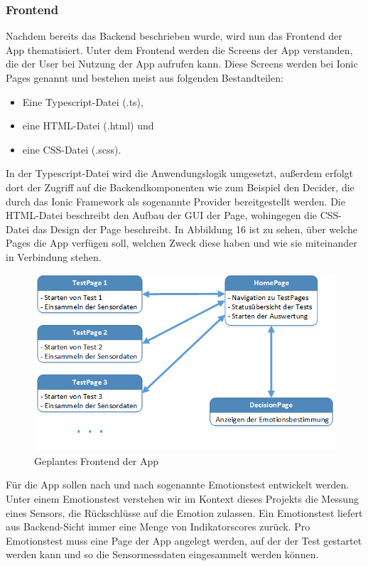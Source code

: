 \subsubsection{Frontend}
Nachdem bereits das Backend beschrieben wurde, wird nun das Frontend der App thematisiert. Unter dem Frontend werden die Screens der App verstanden, die der User bei Nutzung der App aufrufen kann. Diese Screens werden bei Ionic Pages genannt und bestehen meist aus folgenden Bestandteilen: 
\begin{itemize}[noitemsep, topsep=0pt]
	\item Eine Typescript-Datei (.ts), 
	\item eine HTML-Datei (.html) und
	\item eine CSS-Datei (.scss).
\end{itemize}
In der Typescript-Datei wird die Anwendungslogik umgesetzt, außerdem erfolgt dort der Zugriff auf die Backendkomponenten wie zum Beispiel den Decider, die durch das Ionic Framework als sogenannte Provider bereitgestellt werden. Die HTML-Datei beschreibt den Aufbau der GUI der Page, wohingegen die CSS-Datei das Design der Page beschreibt. \newline
In Abbildung 16 ist zu sehen, über welche Pages die App verfügen soll, welchen Zweck diese haben und wie sie miteinander in Verbindung stehen.
\begin{figure}[h]
	\centering
	\includegraphics[width=15cm]{Bilder/frontend.png}
	\caption[Geplantes Frontend der App]{Geplantes Frontend der App}
\end{figure}%
\newline
Für die App sollen nach und nach sogenannte Emotionstest entwickelt werden. Unter einem Emotionstest verstehen wir im Kontext dieses Projekts die Messung eines Sensors, die Rückschlüsse auf die Emotion zulassen. Ein Emotionstest liefert aus Backend-Sicht immer eine Menge von Indikatorscores zurück. Pro Emotionstest muss eine Page der App angelegt werden, auf der der Test gestartet werden kann und so die Sensormessdaten eingesammelt werden können. \newline

